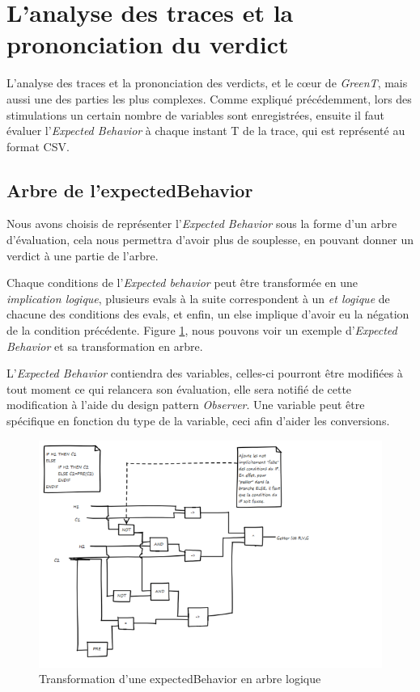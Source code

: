 \section{L'analyse des traces et la prononciation du verdict}
	L'analyse des traces et la prononciation des verdicts, et le c\oe{}ur de \textit{GreenT}, mais aussi une des parties les plus complexes. Comme expliqué précédemment, lors des stimulations un certain nombre de variables sont enregistrées, ensuite il faut évaluer l'\textit{Expected Behavior} à chaque instant T de la trace, qui est représenté au format CSV. 

	\subsection{Arbre de l'expectedBehavior}
 	Nous avons choisis de représenter l'\textit{Expected Behavior} sous la forme d'un arbre d'évaluation, cela nous permettra d'avoir plus de souplesse, en pouvant donner un verdict à une partie de l'arbre.

 	Chaque conditions de l'\textit{Expected behavior} peut être transformée en une \textit{implication logique}, plusieurs evals à la suite correspondent à un \textit{et logique} de chacune des conditions des evals, et enfin, un else implique d'avoir eu la négation de la condition précédente. Figure \ref{fig:diagLogique}, nous pouvons voir un exemple d'\textit{Expected Behavior} et sa transformation en arbre.


L'\textit{Expected Behavior} contiendra des variables, celles-ci pourront être modifiées à tout moment ce qui relancera son évaluation, elle sera notifié de cette modification à l'aide du design pattern \textit{Observer}. Une variable peut être spécifique en fonction du type de la variable, ceci afin d'aider les conversions.

 	\begin{figure}[H]
 		\centering
 		\includegraphics[width=18cm]{contents/images/diagLogique.png}
 		\caption{Transformation d'une expectedBehavior en arbre logique}
 		\label{fig:diagLogique}
 	\end{figure}


